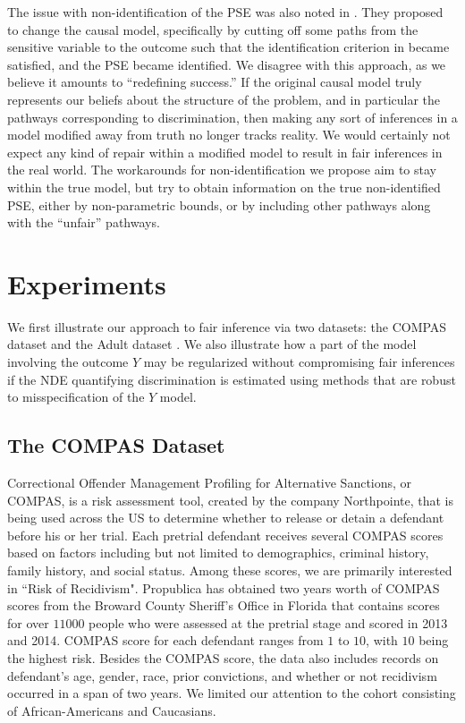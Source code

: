 \documentclass[letterpaper]{article} %
\newcommand{\citep}{\cite}
\begin{document}
The issue with non-identification of the PSE was also noted in \citep{Zhang17causal}. They proposed to change the causal model, specifically by cutting off some paths from the sensitive variable to the outcome such that the identification criterion in \citep{shpitser13cogsci} became satisfied, and the PSE became identified.
We  disagree with this approach, as we believe it amounts to ``redefining success.''  If the original causal model truly represents our beliefs about the structure of the problem, and in particular the pathways corresponding to discrimination, then making any sort of inferences in a model modified away from truth no longer tracks reality.  We would certainly not expect any kind of repair within a modified model to result in fair inferences in the real world.  The workarounds for non-identification we propose aim to stay within the true model, but try to obtain information on the true non-identified PSE, either by non-parametric bounds, or by including other pathways along with the ``unfair'' pathways.

\section{Experiments}
\label{sec:experiments}

We first illustrate our approach to fair inference via two datasets: the COMPAS dataset \citep{propublica} and the Adult dataset \citep{Lichman13adult}. We also
illustrate how a part of the model involving the outcome $Y$ may be regularized without compromising fair inferences if the NDE quantifying discrimination is estimated
using methods that are robust to misspecification of the $Y$ model.

\subsection{The COMPAS Dataset}
\label{sec:exp-COMPAS}

Correctional Offender Management Profiling for Alternative Sanctions, or COMPAS, is a risk assessment tool, created by the company Northpointe, that is being used across the US to determine whether to release or detain a defendant before his or her trial. Each pretrial defendant receives several COMPAS scores based on factors including but not limited to demographics, criminal history, family history, and social status. Among these scores, we are primarily interested in ``Risk of Recidivism". Propublica \citep{propublica} has obtained two years worth of COMPAS scores from the Broward County Sheriff's Office in Florida that contains scores for over $11000$ people who were assessed at the pretrial stage and scored in 2013 and 2014. COMPAS score for each defendant ranges from $1$ to $10$, with $10$ being the highest risk. 
Besides the COMPAS score, the data also includes records on defendant's age, gender, race, prior convictions, and whether or not recidivism occurred in a span of two years. We limited our attention to the cohort consisting of African-Americans and Caucasians. 
\end{document}
